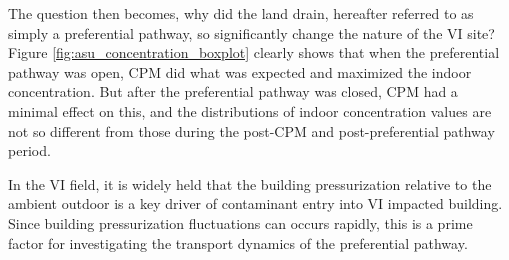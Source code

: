 The question then becomes, why did the land drain, hereafter referred to as simply a preferential pathway, so significantly change the nature of the VI site?
Figure \ref{fig:asu_concentration_boxplot} clearly shows that when the preferential pathway was open, CPM did what was expected and maximized the indoor concentration.
But after the preferential pathway was closed, CPM had a minimal effect on this, and the distributions of indoor concentration values are not so different from those during the post-CPM and post-preferential pathway period.\par

In the VI field, it is widely held that the building pressurization relative to the ambient outdoor is a key driver of contaminant entry into VI impacted building.
Since building pressurization fluctuations can occurs rapidly, this is a prime factor for investigating the transport dynamics of the preferential pathway.
